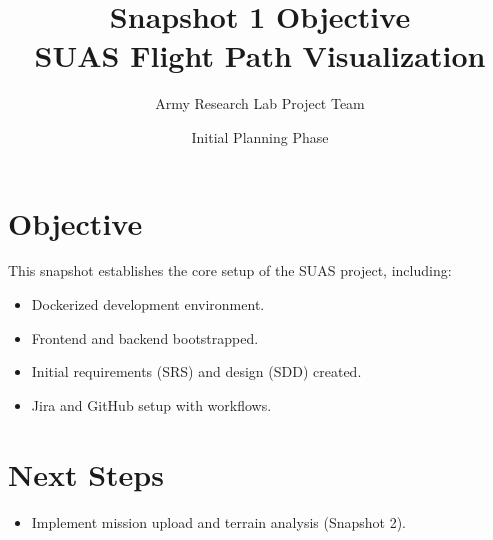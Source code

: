 \documentclass[12pt]{article}
\title{Snapshot 1 Objective\\SUAS Flight Path Visualization}
\author{Army Research Lab Project Team}
\date{Initial Planning Phase}
\begin{document}
\maketitle

\section{Objective}
This snapshot establishes the core setup of the SUAS project, including:
\begin{itemize}
  \item Dockerized development environment.
  \item Frontend and backend bootstrapped.
  \item Initial requirements (SRS) and design (SDD) created.
  \item Jira and GitHub setup with workflows.
\end{itemize}

\section{Next Steps}
\begin{itemize}
  \item Implement mission upload and terrain analysis (Snapshot 2).
\end{itemize}
\end{document}
